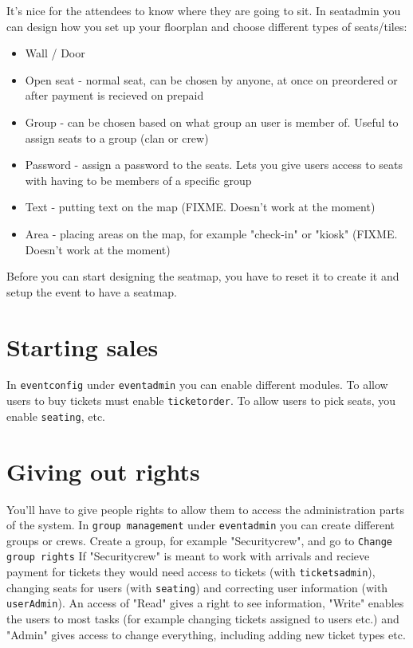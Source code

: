 It's nice for the attendees to know where they are going to sit.
In seatadmin you can design how you set up your floorplan and choose
different types of seats/tiles:
\begin{itemize}
\item Wall / Door
\item Open seat - normal seat, can be chosen by anyone, at once on preordered
or after payment is recieved on prepaid
\item Group - can be chosen based on what group an user is member of. Useful
to assign seats to a group (clan or crew)
\item Password - assign a password to the seats. Lets you give users access to
seats with having to be members of a specific group
\item Text - putting text on the map (FIXME. Doesn't work at the moment)
\item Area - placing areas on the map, for example "check-in" or "kiosk" (FIXME. Doesn't work at the moment)
\end{itemize}

Before you can start designing the seatmap, you have to reset it to create it
and setup the event to have a seatmap.

\section{Starting sales}

In \lstinline!eventconfig! under \lstinline!eventadmin! you can enable
different modules. To allow users to buy tickets must enable
\lstinline!ticketorder!. To allow users to pick seats, you enable
\lstinline!seating!, etc.

\section{Giving out rights}

You'll have to give people rights to allow them to access the
administration parts of the system.
In \lstinline!group management! under \lstinline!eventadmin! you can create
different groups or crews. Create a group, for example "Securitycrew", and go
to \lstinline!Change group rights! If "Securitycrew" is meant to work with
arrivals and recieve payment for tickets they would need access to
tickets (with \lstinline!ticketsadmin!), changing seats for users (with
\lstinline!seating!) and correcting user information (with
\lstinline!userAdmin!). An access of "Read" gives a right to see information,
"Write" enables the users to most tasks (for example changing tickets assigned
to users etc.) and "Admin" gives access to change everything, including adding
new ticket types etc.
